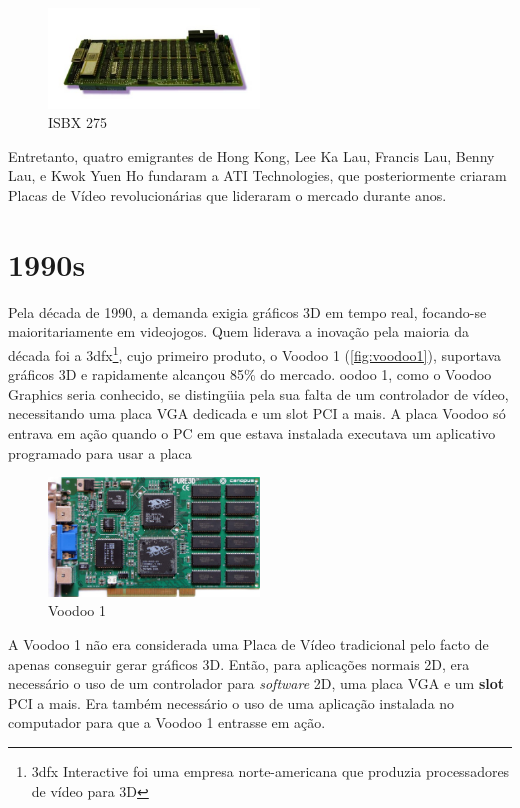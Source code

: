 \documentclass{report}
\begin{document}
\begin{figure}[h]
\centering
\includegraphics[width=0.5\textwidth]{isbx.jpg}
\caption{ISBX 275}
\label{fig:isbx}
\end{figure}

Entretanto, quatro emigrantes de Hong Kong, Lee Ka Lau, Francis Lau, Benny Lau, e Kwok Yuen Ho fundaram a ATI Technologies, que posteriormente criaram Placas de Vídeo revolucionárias que lideraram o mercado durante anos. 
\clearpage
\section{1990s}

Pela década de 1990, a demanda exigia gráficos 3D em tempo real, focando-se maioritariamente em videojogos. Quem liderava a inovação pela maioria da década foi a 3dfx\footnote{3dfx Interactive foi uma empresa norte-americana que produzia processadores de vídeo para 3D}, cujo primeiro produto, o Voodoo 1 (\autoref{fig:voodoo1}), suportava gráficos 3D e rapidamente alcançou 85\% do mercado\cite{market}. oodoo 1, como o Voodoo Graphics seria conhecido, se distingüia pela sua falta de um controlador de vídeo, necessitando uma placa VGA dedicada e um slot PCI a mais. A placa Voodoo só entrava em ação quando o PC em que estava instalada executava um aplicativo programado para usar a placa

\begin{figure}[h]
\centering
\includegraphics[width=0.5\textwidth]{voodoo1.jpg}
\caption{Voodoo 1}
\label{fig:voodoo1}
\end{figure}

A Voodoo 1 não era considerada uma Placa de Vídeo tradicional pelo facto de apenas conseguir gerar gráficos 3D. Então, para aplicações normais 2D, era necessário o uso de um controlador para \textit{software} 2D, uma placa VGA e um \textbf{slot} PCI a mais. Era também necessário o uso de uma aplicação instalada no computador para que a Voodoo 1 entrasse em ação.
\vspace{5mm}
\end{document}
